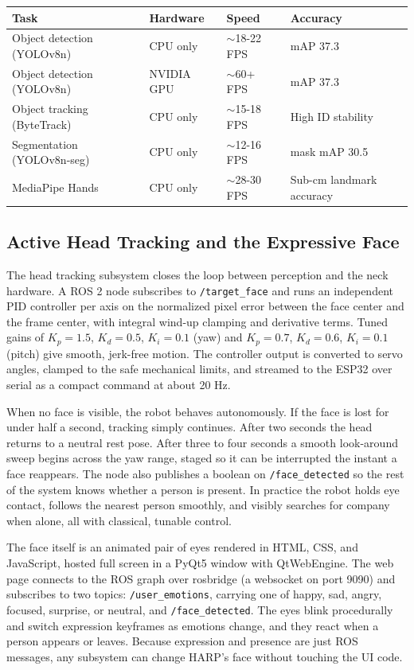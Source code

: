 \documentclass[11pt,a4paper]{article}
\begin{document}
\begin{table}[H]
\centering
\begin{tabular}{@{}llll@{}}
\toprule
\textbf{Task} & \textbf{Hardware} & \textbf{Speed} & \textbf{Accuracy} \\
\midrule
Object detection (YOLOv8n) & CPU only & $\sim$18-22 FPS & mAP 37.3 \\
Object detection (YOLOv8n) & NVIDIA GPU & $\sim$60+ FPS & mAP 37.3 \\
Object tracking (ByteTrack) & CPU only & $\sim$15-18 FPS & High ID stability \\
Segmentation (YOLOv8n-seg) & CPU only & $\sim$12-16 FPS & mask mAP 30.5 \\
MediaPipe Hands & CPU only & $\sim$28-30 FPS & Sub-cm landmark accuracy \\
\bottomrule
\end{tabular}
\end{table}

\subsection{Active Head Tracking and the Expressive Face}

The head tracking subsystem closes the loop between perception and the neck hardware. A ROS 2 node subscribes to \texttt{/target\_face} and runs an independent PID controller per axis on the normalized pixel error between the face center and the frame center, with integral wind-up clamping and derivative terms. Tuned gains of $K_p = 1.5$, $K_d = 0.5$, $K_i = 0.1$ (yaw) and $K_p = 0.7$, $K_d = 0.6$, $K_i = 0.1$ (pitch) give smooth, jerk-free motion. The controller output is converted to servo angles, clamped to the safe mechanical limits, and streamed to the ESP32 over serial as a compact command at about 20 Hz.

When no face is visible, the robot behaves autonomously. If the face is lost for under half a second, tracking simply continues. After two seconds the head returns to a neutral rest pose. After three to four seconds a smooth look-around sweep begins across the yaw range, staged so it can be interrupted the instant a face reappears. The node also publishes a boolean on \texttt{/face\_detected} so the rest of the system knows whether a person is present. In practice the robot holds eye contact, follows the nearest person smoothly, and visibly searches for company when alone, all with classical, tunable control.

The face itself is an animated pair of eyes rendered in HTML, CSS, and JavaScript, hosted full screen in a PyQt5 window with QtWebEngine. The web page connects to the ROS graph over rosbridge (a websocket on port 9090) and subscribes to two topics: \texttt{/user\_emotions}, carrying one of happy, sad, angry, focused, surprise, or neutral, and \texttt{/face\_detected}. The eyes blink procedurally and switch expression keyframes as emotions change, and they react when a person appears or leaves. Because expression and presence are just ROS messages, any subsystem can change HARP's face without touching the UI code.
\end{document}
